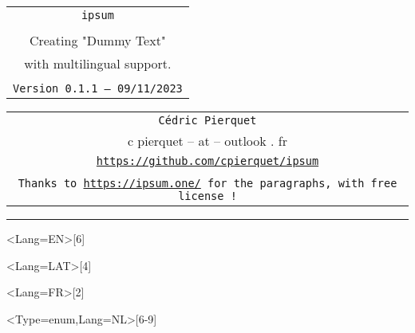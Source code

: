 \documentclass[11pt,a4paper]{ltxdoc}
\def\TPversion{0.1.1}
\def\TPdate{09/11/2023}
\begin{document}
\pagestyle{fancy}

\thispagestyle{empty}

\begin{center}
	\begin{minipage}{0.88\linewidth}
	\begin{tcolorbox}[colframe=yellow,colback=yellow!15]
		\begin{center}
			\begin{tabular}{c}
				{\Huge \texttt{ipsum}}\\
				\\
				{\LARGE Creating "Dummy Text"} \\
				{\LARGE with multilingual support.} \\
				\\
				{\small \texttt{Version \TPversion{} -- \TPdate}}
		\end{tabular}
		\end{center}
	\end{tcolorbox}
\end{minipage}
\end{center}

\begin{center}
	\begin{tabular}{c}
	\texttt{Cédric Pierquet}\\
	{\ttfamily c pierquet -- at -- outlook . fr}\\
	\texttt{\url{https://github.com/cpierquet/ipsum}} \\
	\\
	\texttt{Thanks to \url{https://ipsum.one/} for the paragraphs, with free license !}
\end{tabular}
\end{center}

\hrule

\vfill

\begin{tcolorbox}[colframe=lightgray,colback=lightgray!5]
\ipsum<Lang=EN>[6]
\end{tcolorbox}

\begin{tcolorbox}[colframe=lightgray,colback=lightgray!5]
\ipsum<Lang=LAT>[4]
\end{tcolorbox}

\begin{tcolorbox}[colframe=lightgray,colback=lightgray!5]
\ipsum<Lang=FR>[2]
\end{tcolorbox}

\begin{tcolorbox}[colframe=lightgray,colback=lightgray!5]
\ipsum<Type=enum,Lang=NL>[6-9]
\end{tcolorbox}
\end{document}
